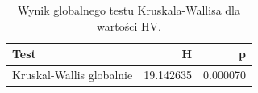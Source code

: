 \begin{table}
\caption{Wynik globalnego testu Kruskala-Wallisa dla wartości HV.}
\label{tab:kruskal_global}
\begin{tabular}{lrr}
\toprule
Test & H & p \\
\midrule
Kruskal-Wallis globalnie & 19.142635 & 0.000070 \\
\bottomrule
\end{tabular}
\end{table}
